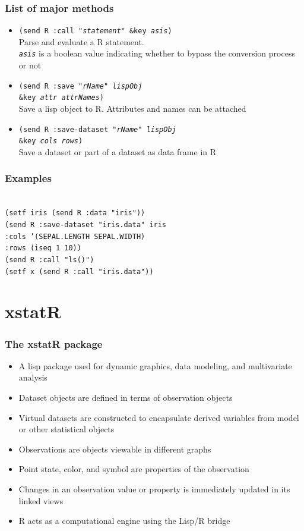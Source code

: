 \documentclass{beamer}
\begin{document}
\begin{frame}
\frametitle{List of major methods}
\begin{itemize}
	\item \texttt{(send R :call \emph{"statement"} \&key \emph{asis})}\\
	Parse and evaluate a R statement.\\
	\texttt{\emph{asis}} is a boolean value indicating whether to bypass the conversion process or not
	\item \texttt{(send R :save \emph{"rName"} \emph{lispObj}\\ 
	\&key \emph{attr attrNames})}\\
	Save a lisp object to R. Attributes and names can be attached
	\item \texttt{(send R :save-dataset \emph{"rName"} \emph{lispObj}\\ 
	\&key \emph{cols rows})}\\
	Save a dataset or part of a dataset as data frame in R
\end{itemize}
\end{frame}

\begin{frame}
\frametitle{Examples}
\texttt{
\\
(setf iris (send R :data "iris")) \\
(send R :save-dataset "iris.data" iris \\
	:cols '(SEPAL.LENGTH SEPAL.WIDTH) \\
	:rows (iseq 1 10)) \\
(send R :call "ls()") \\
(setf x (send R :call "iris.data")) 
}
\end{frame}

\section{xstatR}

\begin{frame}
\frametitle{The xstatR package}
\begin{itemize}
	\item A lisp package used for dynamic graphics, data modeling, and multivariate analysis
	\item Dataset objects are defined in terms of observation objects
	\item Virtual datasets are constructed to encapsulate derived variables from model or other statistical objects
	\item Observations are objects viewable in different graphs
	\item Point state, color, and symbol are properties of the observation
	\item Changes in an observation value or property is immediately updated in its linked views
	\item R acts as a computational engine using the Lisp/R bridge
\end{itemize}
\end{frame}
\end{document}
